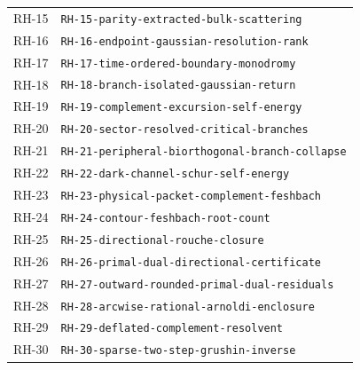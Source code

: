 \begin{longtable}{r >{\raggedright\arraybackslash}p{}}
RH-15 & \texttt{RH-\allowbreak{}15-\allowbreak{}parity-\allowbreak{}extracted-\allowbreak{}bulk-\allowbreak{}scattering}\\
RH-16 & \texttt{RH-\allowbreak{}16-\allowbreak{}endpoint-\allowbreak{}gaussian-\allowbreak{}resolution-\allowbreak{}rank}\\
RH-17 & \texttt{RH-\allowbreak{}17-\allowbreak{}time-\allowbreak{}ordered-\allowbreak{}boundary-\allowbreak{}monodromy}\\
RH-18 & \texttt{RH-\allowbreak{}18-\allowbreak{}branch-\allowbreak{}isolated-\allowbreak{}gaussian-\allowbreak{}return}\\
RH-19 & \texttt{RH-\allowbreak{}19-\allowbreak{}complement-\allowbreak{}excursion-\allowbreak{}self-\allowbreak{}energy}\\
RH-20 & \texttt{RH-\allowbreak{}20-\allowbreak{}sector-\allowbreak{}resolved-\allowbreak{}critical-\allowbreak{}branches}\\
RH-21 & \texttt{RH-\allowbreak{}21-\allowbreak{}peripheral-\allowbreak{}biorthogonal-\allowbreak{}branch-\allowbreak{}collapse}\\
RH-22 & \texttt{RH-\allowbreak{}22-\allowbreak{}dark-\allowbreak{}channel-\allowbreak{}schur-\allowbreak{}self-\allowbreak{}energy}\\
RH-23 & \texttt{RH-\allowbreak{}23-\allowbreak{}physical-\allowbreak{}packet-\allowbreak{}complement-\allowbreak{}feshbach}\\
RH-24 & \texttt{RH-\allowbreak{}24-\allowbreak{}contour-\allowbreak{}feshbach-\allowbreak{}root-\allowbreak{}count}\\
RH-25 & \texttt{RH-\allowbreak{}25-\allowbreak{}directional-\allowbreak{}rouche-\allowbreak{}closure}\\
RH-26 & \texttt{RH-\allowbreak{}26-\allowbreak{}primal-\allowbreak{}dual-\allowbreak{}directional-\allowbreak{}certificate}\\
RH-27 & \texttt{RH-\allowbreak{}27-\allowbreak{}outward-\allowbreak{}rounded-\allowbreak{}primal-\allowbreak{}dual-\allowbreak{}residuals}\\
RH-28 & \texttt{RH-\allowbreak{}28-\allowbreak{}arcwise-\allowbreak{}rational-\allowbreak{}arnoldi-\allowbreak{}enclosure}\\
RH-29 & \texttt{RH-\allowbreak{}29-\allowbreak{}deflated-\allowbreak{}complement-\allowbreak{}resolvent}\\
RH-30 & \texttt{RH-\allowbreak{}30-\allowbreak{}sparse-\allowbreak{}two-\allowbreak{}step-\allowbreak{}grushin-\allowbreak{}inverse}\\

\end{longtable}
